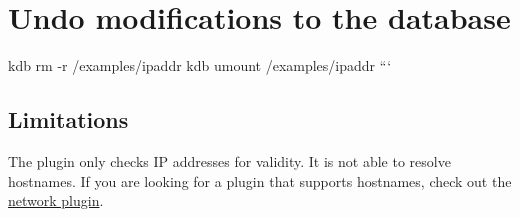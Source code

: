 \section*{Undo modifications to the database}

kdb rm -\/r /examples/ipaddr kdb umount /examples/ipaddr ```

\subsection*{Limitations}

The plugin only checks IP addresses for validity. It is not able to resolve hostnames. If you are looking for a plugin that supports hostnames, check out the \hyperlink{md_src_plugins_network_README_src_plugins_network_README_md}{network plugin}. 